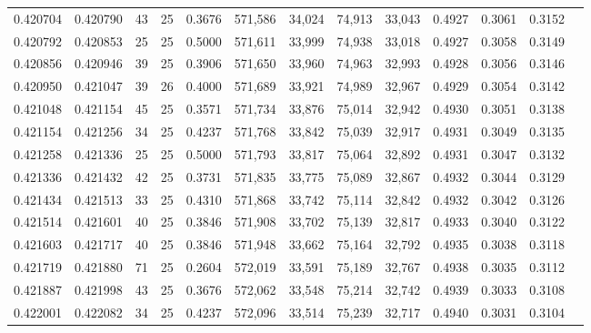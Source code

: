 \begin{tabular}{rrrrrrrrrrrrr}
0.420704 & 0.420790 &    43 &  25 &                                     0.3676 & 571,586 &  34,024 &  74,913 &  33,043 & 0.4927 & 0.3061 & 0.3152 \\
0.420792 & 0.420853 &    25 &  25 &                                     0.5000 & 571,611 &  33,999 &  74,938 &  33,018 & 0.4927 & 0.3058 & 0.3149 \\
0.420856 & 0.420946 &    39 &  25 &                                     0.3906 & 571,650 &  33,960 &  74,963 &  32,993 & 0.4928 & 0.3056 & 0.3146 \\
0.420950 & 0.421047 &    39 &  26 &                                     0.4000 & 571,689 &  33,921 &  74,989 &  32,967 & 0.4929 & 0.3054 & 0.3142 \\
0.421048 & 0.421154 &    45 &  25 &                                     0.3571 & 571,734 &  33,876 &  75,014 &  32,942 & 0.4930 & 0.3051 & 0.3138 \\
0.421154 & 0.421256 &    34 &  25 &                                     0.4237 & 571,768 &  33,842 &  75,039 &  32,917 & 0.4931 & 0.3049 & 0.3135 \\
0.421258 & 0.421336 &    25 &  25 &                                     0.5000 & 571,793 &  33,817 &  75,064 &  32,892 & 0.4931 & 0.3047 & 0.3132 \\
0.421336 & 0.421432 &    42 &  25 &                                     0.3731 & 571,835 &  33,775 &  75,089 &  32,867 & 0.4932 & 0.3044 & 0.3129 \\
0.421434 & 0.421513 &    33 &  25 &                                     0.4310 & 571,868 &  33,742 &  75,114 &  32,842 & 0.4932 & 0.3042 & 0.3126 \\
0.421514 & 0.421601 &    40 &  25 &                                     0.3846 & 571,908 &  33,702 &  75,139 &  32,817 & 0.4933 & 0.3040 & 0.3122 \\
0.421603 & 0.421717 &    40 &  25 &                                     0.3846 & 571,948 &  33,662 &  75,164 &  32,792 & 0.4935 & 0.3038 & 0.3118 \\
0.421719 & 0.421880 &    71 &  25 &                                     0.2604 & 572,019 &  33,591 &  75,189 &  32,767 & 0.4938 & 0.3035 & 0.3112 \\
0.421887 & 0.421998 &    43 &  25 &                                     0.3676 & 572,062 &  33,548 &  75,214 &  32,742 & 0.4939 & 0.3033 & 0.3108 \\
0.422001 & 0.422082 &    34 &  25 &                                     0.4237 & 572,096 &  33,514 &  75,239 &  32,717 & 0.4940 & 0.3031 & 0.3104 \\

\end{tabular}
